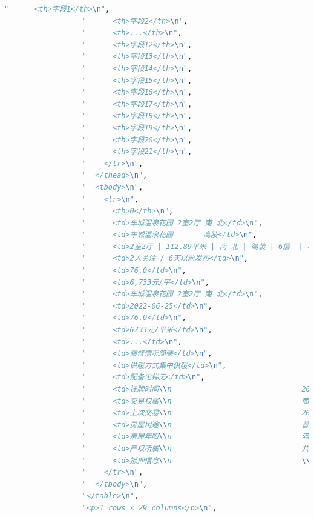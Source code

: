 \documentclass[withoutpreface,bwprint]{cumcmthesis} %
\begin{document}
\begin{appendices}
\begin{lstlisting}[language=Python]
                  "      <th>字段1</th>\n",
                  "      <th>字段2</th>\n",
                  "      <th>...</th>\n",
                  "      <th>字段12</th>\n",
                  "      <th>字段13</th>\n",
                  "      <th>字段14</th>\n",
                  "      <th>字段15</th>\n",
                  "      <th>字段16</th>\n",
                  "      <th>字段17</th>\n",
                  "      <th>字段18</th>\n",
                  "      <th>字段19</th>\n",
                  "      <th>字段20</th>\n",
                  "      <th>字段21</th>\n",
                  "    </tr>\n",
                  "  </thead>\n",
                  "  <tbody>\n",
                  "    <tr>\n",
                  "      <th>0</th>\n",
                  "      <td>车城温泉花园 2室2厅 南 北</td>\n",
                  "      <td>车城温泉花园    -  高陵</td>\n",
                  "      <td>2室2厅 | 112.89平米 | 南 北 | 简装 | 6层  | 板塔结合</td>\n",
                  "      <td>2人关注 / 6天以前发布</td>\n",
                  "      <td>76.0</td>\n",
                  "      <td>6,733元/平</td>\n",
                  "      <td>车城温泉花园 2室2厅 南 北</td>\n",
                  "      <td>2022-06-25</td>\n",
                  "      <td>76.0</td>\n",
                  "      <td>6733元/平米</td>\n",
                  "      <td>...</td>\n",
                  "      <td>装修情况简装</td>\n",
                  "      <td>供暖方式集中供暖</td>\n",
                  "      <td>配备电梯无</td>\n",
                  "      <td>挂牌时间\\n                              2022-06-25</td>\n",
                  "      <td>交易权属\\n                              商品房</td>\n",
                  "      <td>上次交易\\n                              2007-11-07</td>\n",
                  "      <td>房屋用途\\n                              普通住宅</td>\n",
                  "      <td>房屋年限\\n                              满五年</td>\n",
                  "      <td>产权所属\\n                              共有</td>\n",
                  "      <td>抵押信息\\n                              \\n        ...</td>\n",
                  "    </tr>\n",
                  "  </tbody>\n",
                  "</table>\n",
                  "<p>1 rows × 29 columns</p>\n",

\end{lstlisting}
\end{appendices}
\end{document}
